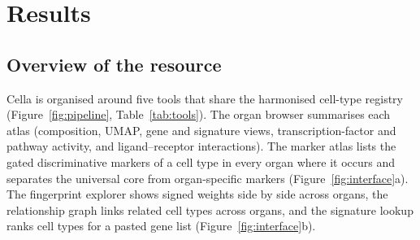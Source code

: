 \documentclass[11pt]{article}
\newcommand{\cella}{Cella}
\begin{document}
\section{Results}

\subsection{Overview of the resource}

\cella{} is organised around five tools that share the harmonised cell-type registry (Figure~\ref{fig:pipeline}, Table~\ref{tab:tools}). The organ browser summarises each atlas (composition, UMAP, gene and signature views, transcription-factor and pathway activity, and ligand--receptor interactions). The marker atlas lists the gated discriminative markers of a cell type in every organ where it occurs and separates the universal core from organ-specific markers (Figure~\ref{fig:interface}a). The fingerprint explorer shows signed weights side by side across organs, the relationship graph links related cell types across organs, and the signature lookup ranks cell types for a pasted gene list (Figure~\ref{fig:interface}b).
\end{document}
